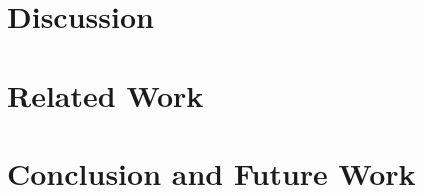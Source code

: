 \documentclass[journal]{IEEEtran}
\begin{document}
\section{Discussion}\label{sec:discussion}


\section{Related Work}\label{sec:related-work}


\section{Conclusion and Future Work}\label{sec:conclusion}









\end{document}
